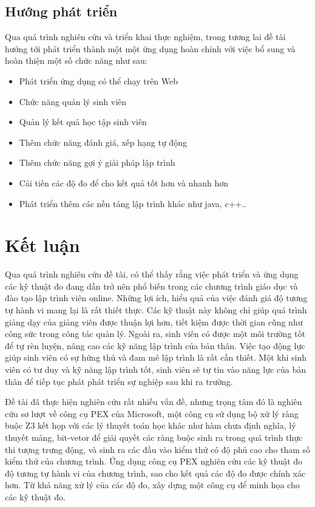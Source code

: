 \subsection{Hướng phát triển}
Qua quá trình nghiên cứu và triển khai thực nghiệm, trong tương lai đề tài hướng tới phát triển thành một một ứng dụng hoàn chỉnh với việc bổ sung và hoàn thiện một số chức năng như sau:
\begin{itemize}
	\item Phát triển ứng dụng có thể chạy trên Web
	\item Chức năng quản lý sinh viên
	\item Quản lý kết quả học tập sinh viên
	\item Thêm chức năng đánh giá, xếp hạng tự động
	\item Thêm chức năng gợi ý giải pháp lập trình
	\item Cải tiến các độ đo để cho kết quả tốt hơn và nhanh hơn
	\item Phát triển thêm các nền tảng lập trình khác như java, c++..		
\end{itemize}

\section{Kết luận}
Qua quá trình nghiên cứu đề tài, có thể thấy rằng việc phát triển và ứng dụng các kỹ thuật đo đang dần trở nên phổ biến trong các chương trình giáo dục và đào tạo lập trình viên online. Những lợi ích, hiểu quả của việc đánh giá độ tương tự hành vi mang lại là rất thiết thực. Các kỹ thuật này không chỉ giúp quá trình giảng dạy của giảng viên được thuận lợi hơn, tiết kiệm được thời gian cũng như công sức trong công tác quản lý. Ngoài ra, sinh viên có được một môi trường tốt để tự rèn luyện, nâng cao các kỹ năng lập trình của bản thân. Việc tạo động lực giúp sinh viên có sự hứng thú và đam mê lập trình là rất cần thiết. Một khi sinh viên có tư duy và kỹ năng lập trình tốt, sinh viên sẽ tự tin vào năng lực của bản thân để tiếp tục phát phát triển sự nghiệp sau khi ra trường.

Đề tài đã thực hiện nghiên cứu rất nhiều vấn đề, nhưng trọng tâm đó là nghiên cứu sơ lượt về công cụ PEX của Microsoft, một công cụ sử dụng bộ xử lý ràng buộc Z3 \cite{de2008z3} kết họp với các lý thuyết toán học khác như hàm chưa định nghĩa, lý thuyết mảng, bit-vetor \cite{kroening2016decision} để giải quyết các ràng buộc sinh ra trong quá trình thực thi tượng trưng động, và sinh ra các đầu vào kiểm thử có độ phủ cao cho tham số kiểm thử của chương trình. Ứng dụng công cụ PEX nghiên cứu các kỹ thuật đo độ tương tự hành vi của chương trình, sao cho kết quả các độ đo được chính xác hơn. Từ khả năng xử lý của các độ đo, xây dựng một công cụ để minh họa cho các kỹ thuật đo.

